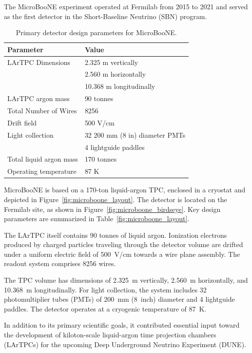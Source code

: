 \documentclass{pracalicmgr}
\begin{document}
The MicroBooNE experiment operated at Fermilab from 2015 to 2021 and served as the first detector in the Short-Baseline Neutrino (SBN) program. 

\begin{table}[H]
\centering
\caption{Primary detector design parameters for MicroBooNE.}
\begin{tabular}{|l|l|}
\hline
\textbf{Parameter} & \textbf{Value} \\
\hline
LArTPC Dimensions & 2.325 m vertically \\
                  & 2.560 m horizontally \\
                  & 10.368 m longitudinally \\
\hline
LArTPC argon mass & 90 tonnes \\
\hline
Total Number of Wires & 8256 \\
\hline
Drift field & 500 V/cm \\
\hline
Light collection & 32 200 mm (8 in) diameter PMTs \\
                 & 4 lightguide paddles \\
\hline
Total liquid argon mass & 170 tonnes \\
\hline
Operating temperature & 87 K \\
\hline
\end{tabular}
\label{tab:microboone_specs}
\end{table}

MicroBooNE is based on a 170-ton liquid-argon TPC, enclosed in a cryostat and depicted in Figure~\ref{fig:microboone_layout}. The detector is located on the Fermilab site, as shown in Figure~\ref{fig:microboone_birdseye}. Key design parameters are summarized in Table~\ref{fig:microboone_layout}.

The LArTPC itself contains 90 tonnes of liquid argon. Ionization electrons produced by charged particles traveling through the detector volume are drifted under a uniform electric field of 500~V/cm towards a wire plane assembly. The readout system comprises 8256 wires.

The TPC volume has dimensions of 2.325~m vertically, 2.560~m horizontally, and 10.368~m longitudinally. For light collection, the system includes 32 photomultiplier tubes (PMTs) of 200~mm (8~inch) diameter and 4 lightguide paddles. The detector operates at a cryogenic temperature of 87~K.

In addition to its primary scientific goals, it contributed essential input toward the development of kiloton-scale liquid-argon time projection chambers (LArTPCs) for the upcoming Deep Underground Neutrino Experiment (DUNE).
\end{document}
